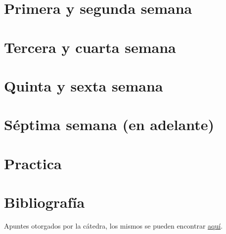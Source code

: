 \documentclass[titlepage,a4paper]{article}
\begin{document}
\newpage
\section*{Primera y segunda semana}



\newpage
\section*{Tercera y cuarta semana}


\newpage
\section*{Quinta y sexta semana}


\newpage
\section*{Séptima semana (en adelante)}


\newpage
\section{Practica}


\newpage


\newpage


\newpage


\newpage
\section{Bibliografía}

Apuntes otorgados por la cátedra, los mismos se pueden encontrar \href{https://campus.fi.uba.ar/mod/page/view.php?id=108751}{aquí}.
\end{document}
